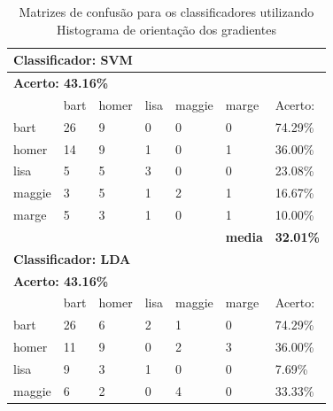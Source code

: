 \documentclass[journal]{IEEEtran}
\begin{document}
\begin{table}[!htb]
\centering
\caption{Matrizes de confusão para os classificadores utilizando Histograma de orientação dos gradientes}
\label{tbl:hog}
\small
\singlespacing
\begin{tabular}{l|l|l|l|l|l|l} \hline
\multicolumn{7}{l}{\textbf{Classificador: SVM}}                                                \\ \hline
\multicolumn{7}{l}{\textbf{Acerto: 43.16\%}}                                                  \\ \hline
          & bart      & homer     & lisa      & maggie    & marge          & Acerto:            \\ \hline
bart      & 26        & 9         & 0         & 0         & 0              & 74.29\%          \\ \hline
homer     & 14        & 9         & 1         & 0         & 1              & 36.00\%          \\ \hline
lisa      & 5         & 5         & 3         & 0         & 0              & 23.08\%          \\ \hline
maggie    & 3         & 5         & 1         & 2         & 1              & 16.67\%          \\ \hline
marge     & 5         & 3         & 1         & 0         & 1              & 10.00\%          \\ \hline
          &           &           &           &           & \textbf{media} & \textbf{32.01\%} \\ \hline
\multicolumn{7}{l}{\textbf{Classificador: LDA}}                                                \\ \hline
\multicolumn{7}{l}{\textbf{Acerto: 43.16\%}}                                                  \\ \hline
          & bart      & homer     & lisa      & maggie    & marge          & Acerto:            \\ \hline
bart      & 26        & 6         & 2         & 1         & 0              & 74.29\%          \\ \hline
homer     & 11        & 9         & 0         & 2         & 3              & 36.00\%          \\ \hline
lisa      & 9         & 3         & 1         & 0         & 0              & 7.69\%           \\ \hline
maggie    & 6         & 2         & 0         & 4         & 0              & 33.33\%          \\ \hline

\end{tabular}
\end{table}
\end{document}
